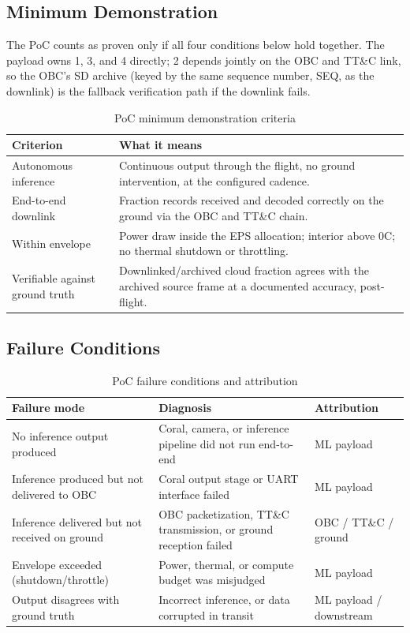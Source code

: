 \subsection{Minimum Demonstration}

The PoC counts as proven only if all four conditions below hold together.
The payload owns 1, 3, and 4 directly; 2 depends jointly on the OBC and
TT\&C link, so the OBC's SD archive (keyed by the same sequence number, SEQ,
as the downlink) is the fallback verification path if the downlink fails.

\begin{table}[H]
\centering
\begin{tabular}{lp{9cm}}
\toprule
\textbf{Criterion} & \textbf{What it means} \\
\midrule
Autonomous inference & Continuous output through the flight, no ground
intervention, at the configured cadence. \\
End-to-end downlink & Fraction records received and decoded correctly on the
ground via the OBC and TT\&C chain. \\
Within envelope & Power draw inside the EPS allocation; interior above
0\textdegree{}C; no thermal shutdown or throttling. \\
Verifiable against ground truth & Downlinked/archived cloud fraction agrees
with the archived source frame at a documented accuracy, post-flight. \\
\bottomrule
\end{tabular}
\caption{PoC minimum demonstration criteria}
\end{table}

\subsection{Failure Conditions}

\begin{table}[H]
\centering
\begin{tabular}{p{4.5cm}p{5cm}l}
\toprule
\textbf{Failure mode} & \textbf{Diagnosis} & \textbf{Attribution} \\
\midrule
No inference output produced & Coral, camera, or inference pipeline did not
run end-to-end & ML payload \\
Inference produced but not delivered to OBC & Coral output stage or UART
interface failed & ML payload \\
Inference delivered but not received on ground & OBC packetization, TT\&C
transmission, or ground reception failed & OBC / TT\&C / ground \\
Envelope exceeded (shutdown/throttle) & Power, thermal, or compute budget was
misjudged & ML payload \\
Output disagrees with ground truth & Incorrect inference, or data corrupted
in transit & ML payload / downstream \\
\bottomrule
\end{tabular}
\caption{PoC failure conditions and attribution}
\label{tab:payload-failure}
\end{table}

